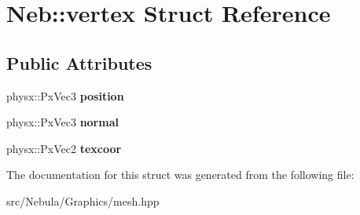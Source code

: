 \hypertarget{structNeb_1_1vertex}{\section{\-Neb\-:\-:vertex \-Struct \-Reference}
\label{structNeb_1_1vertex}
}
\subsection*{\-Public \-Attributes}
\begin{DoxyCompactItemize}
\item 
\hypertarget{structNeb_1_1vertex_a102cf356b8ec3aaa0b97b17d7f9895d2}{physx\-::\-Px\-Vec3 {\bfseries position}}\label{structNeb_1_1vertex_a102cf356b8ec3aaa0b97b17d7f9895d2}

\item 
\hypertarget{structNeb_1_1vertex_a00870a556673b983336f03f46a20c0b2}{physx\-::\-Px\-Vec3 {\bfseries normal}}\label{structNeb_1_1vertex_a00870a556673b983336f03f46a20c0b2}

\item 
\hypertarget{structNeb_1_1vertex_a5bed2aa1a57abd7f0df560e45c4a1802}{physx\-::\-Px\-Vec2 {\bfseries texcoor}}\label{structNeb_1_1vertex_a5bed2aa1a57abd7f0df560e45c4a1802}

\end{DoxyCompactItemize}


\-The documentation for this struct was generated from the following file\-:\begin{DoxyCompactItemize}
\item 
src/\-Nebula/\-Graphics/mesh.\-hpp\end{DoxyCompactItemize}
